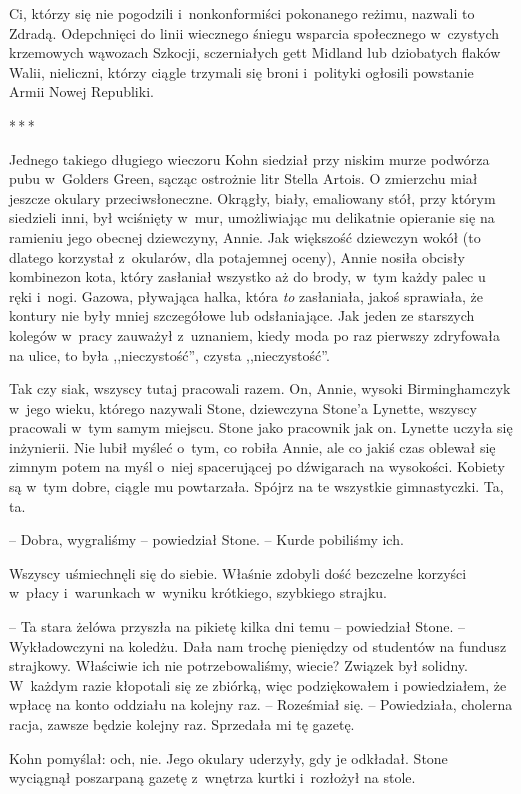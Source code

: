 \documentclass[oneside,polish,11pt,sfheadings]{mwbk}
\newcommand{\threeast}{\bigskip\par\centerline{*\,*\,*}\medskip\par}%
\begin{document}
Ci, którzy się nie pogodzili i~nonkonformiści pokonanego reżimu, nazwali
to Zdradą. Odepchnięci do linii wiecznego śniegu wsparcia społecznego w~czystych krzemowych wąwozach Szkocji, sczerniałych gett Midland lub
dziobatych flaków Walii, nieliczni, którzy ciągle trzymali się broni i~polityki ogłosili powstanie Armii Nowej Republiki.
  \threeast 

Jednego takiego długiego wieczoru Kohn siedział przy niskim murze
podwórza pubu w~Golders Green, sącząc ostrożnie litr Stella Artois. O
zmierzchu miał jeszcze okulary przeciwsłoneczne. Okrągły, biały,
emaliowany stół, przy którym siedzieli inni, był wciśnięty w~mur,
umożliwiając mu delikatnie opieranie się na ramieniu jego obecnej
dziewczyny, Annie. Jak większość dziewczyn wokół (to dlatego korzystał z~okularów, dla potajemnej oceny), Annie nosiła obcisły kombinezon kota,
który zasłaniał wszystko aż do brody, w~tym każdy palec u ręki i~nogi.
Gazowa, pływająca halka, która \emph{to} zasłaniała, jakoś sprawiała, że
kontury nie były mniej szczegółowe lub odsłaniające. Jak jeden ze
starszych kolegów w~pracy zauważył z~uznaniem, kiedy moda po raz
pierwszy zdryfowała na ulice, to była ,,nieczystość'', czysta
,,nieczystość''.

Tak czy siak, wszyscy tutaj pracowali razem. On, Annie, wysoki
Birminghamczyk w~jego wieku, którego nazywali Stone, dziewczyna
Stone'a Lynette, wszyscy pracowali w~tym samym miejscu. Stone jako
pracownik jak on. Lynette uczyła się inżynierii. Nie lubił myśleć o~tym,
co robiła Annie, ale co jakiś czas oblewał się zimnym potem na myśl o~niej spacerującej po dźwigarach na wysokości. Kobiety są w~tym dobre,
ciągle mu powtarzała. Spójrz na te wszystkie gimnastyczki. Ta, ta.

-- Dobra, wygraliśmy -- powiedział Stone. -- Kurde pobiliśmy ich.

Wszyscy uśmiechnęli się do siebie. Właśnie zdobyli dość bezczelne
korzyści w~płacy i~warunkach w~wyniku krótkiego, szybkiego strajku.

-- Ta stara żelówa przyszła na pikietę kilka dni temu -- powiedział Stone.
-- Wykładowczyni na koledżu. Dała nam trochę pieniędzy od studentów na
fundusz strajkowy. Właściwie ich nie potrzebowaliśmy, wiecie? Związek
był solidny. W~każdym razie kłopotali się ze zbiórką, więc podziękowałem
i powiedziałem, że wpłacę na konto oddziału na kolejny raz. -- Roześmiał
się. -- Powiedziała, cholerna racja, zawsze będzie kolejny raz. Sprzedała
mi tę gazetę.

Kohn pomyślał: och, nie. Jego okulary uderzyły, gdy je odkładał. Stone
wyciągnął poszarpaną gazetę z~wnętrza kurtki i~rozłożył na stole.
\end{document}
